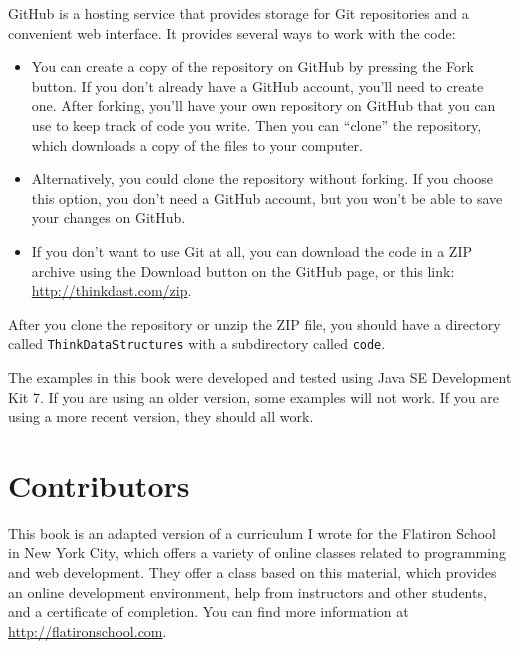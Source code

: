 \documentclass[12pt]{book}
\theoremstyle{exercise}
\begin{document}

GitHub is a hosting service that provides storage for Git repositories
and a convenient web interface.  It provides several ways to work with
the code:

\begin{itemize}

\item You can create a copy of the repository on GitHub by pressing
  the {\sf Fork} button.  If you don't already have a GitHub account,
  you'll need to create one.  After forking, you'll have your own
  repository on GitHub that you can use to keep track of code you
  write.  Then you can ``clone'' the repository, which downloads a
  copy of the files to your computer.


\item Alternatively, you could clone the repository without forking.
  If you choose this option, you don't need a GitHub account, but you
  won't be able to save your changes on GitHub.

\item If you don't want to use Git at all, you can download the code
  in a ZIP archive using the {\sf Download} button on the GitHub
  page, or this link: \url{http://thinkdast.com/zip}.

\end{itemize}

After you clone the repository or unzip the ZIP file, you should have
a directory called {\tt ThinkDataStructures} with a subdirectory
called {\tt code}.

The examples in this book were developed and tested using Java SE
Development Kit 7.  If you are using an older version, some examples
will not work.  If you are using a more recent version, they should
all work.


\section*{Contributors}

This book is an adapted version of a curriculum I wrote for the
Flatiron School in New York City, which offers a variety of online
classes related to programming and web development.  They offer a
class based on this material, which provides an online development
environment, help from instructors and other students, and a
certificate of completion.  You can find more information at
\url{http://flatironschool.com}.
\end{document}
